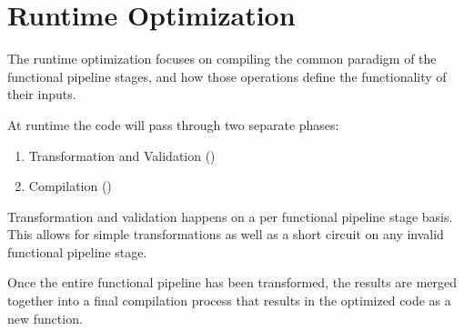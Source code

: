 \section{Runtime Optimization}\label{RuntimeOptimization}
The runtime optimization focuses on compiling the common paradigm of the functional pipeline stages, and how those operations define the functionality of their inputs.

At runtime the code will pass through two separate phases:

\begin{enumerate}
  \item Transformation and Validation ()
  \item Compilation ()
\end{enumerate}

Transformation and validation happens on a per functional pipeline stage basis.  This allows for simple transformations as well as a short circuit on any invalid functional pipeline stage.

Once the entire functional pipeline has been transformed, the results are merged together into a final compilation process that results in the optimized code as a new function. 

\begin{minipage}{\linewidth}

\end{minipage}


